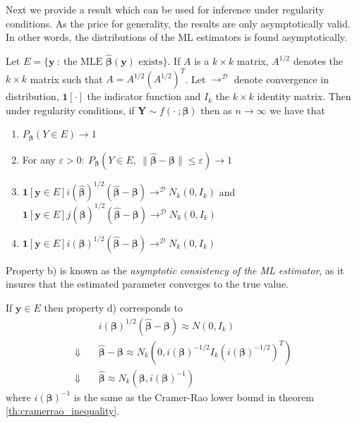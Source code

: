 Next we provide a result which can be used for inference under regularity conditions. 
As the price for generality, the results are only asymptotically valid. 
In other words, the distributions of the ML estimators is found asymptotically. 

\begin{theorem}\label{th:distribution_ml_estimator}
Let $E = \{\mathbf{y} \ : \ \text{the MLE } \hat{\boldsymbol{\beta}}(\mathbf{y}) \text{ exists}\}$. 
If $A$ is a $k \times k$ matrix, $A^{1/2}$ denotes the $k \times k$ matrix such that $A = A^{1/2}\left( A^{1/2} \right)^T$.
Let $\rightarrow^\mathcal{D}$ denote convergence in distribution, $\mathbf{1}[\cdot]$ the indicator function and $I_k$ the $k \times k$ identity matrix.
Then under regularity conditions, if $\mathbf{Y} \sim f(\cdot \ ;\boldsymbol{\beta})$ then as $n \rightarrow \infty$ we have that
\begin{enumerate}[label=(\alph*)]
    \item $P_{\boldsymbol{\beta}}(Y \in E) \rightarrow 1$
    \item For any $\varepsilon > 0: \ P_{\boldsymbol{\beta}}(Y \in E, \ \|\hat{\boldsymbol{\beta}} - \boldsymbol{\beta}\| \leq \varepsilon) \rightarrow 1$
    \item $\mathbf{1}[\mathbf{y} \in E] i(\hat{\boldsymbol{\beta}})^{1/2}(\hat{\boldsymbol{\beta}} - \boldsymbol{\beta}) \rightarrow^\mathcal{D} N_k(0, I_k)$ and $\textbf{1}[\mathbf{y} \in E] j(\hat{\boldsymbol{\beta}})^{1/2}(\hat{\boldsymbol{\beta}} - \boldsymbol{\beta}) \rightarrow^\mathcal{D} N_k(0, I_k)$
    \item $\textbf{1}[\mathbf{y} \in E] i(\boldsymbol{\beta})^{1/2}(\hat{\boldsymbol{\beta}} - \boldsymbol{\beta}) \rightarrow^\mathcal{D} N_k(0, I_k)$
\end{enumerate}
\end{theorem}

Property b) is known as the \textit{asymptotic consistency of the ML estimator}, as it insures that the estimated parameter converges to the true value.

If $\textbf{y}\in E$ then property d) corresponds to
\begin{align*}
    & i(\boldsymbol{\beta})^{1/2} (\hat{\boldsymbol{\beta}}-\boldsymbol{\beta}) \approx N(0,I_k) \\
    \Downarrow \quad & \hat{\boldsymbol{\beta}}-\boldsymbol{\beta} \approx N_k(0,i(\boldsymbol{\beta})^{-1/2} I_k (i(\boldsymbol{\beta})^{-1/2})^T) \\
    \Downarrow \quad & \hat{\boldsymbol{\beta}} \approx N_k(\boldsymbol{\beta}, i(\boldsymbol{\beta})^{-1})
\end{align*}
where $i(\boldsymbol{\beta})^{-1}$ is the same as the Cramer-Rao lower bound in theorem \ref{th:cramerrao_inequality}.


